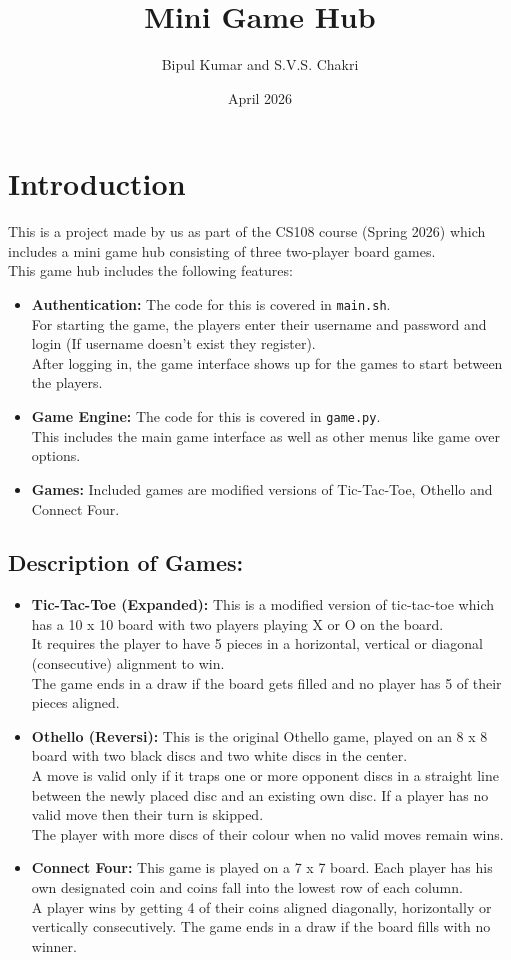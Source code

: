 \documentclass{article}
\title{Mini Game Hub}
\author{Bipul Kumar and S.V.S. Chakri}
\date{April 2026}
\begin{document}
\maketitle
\tableofcontents
\clearpage

\section{Introduction}
This is a project made by us as part of the CS108 course (Spring 2026) which includes a mini game hub consisting of three two-player board games.
\\
This game hub includes the following features:
\begin{itemize}
    \item \textbf{Authentication:} The code for this is covered in \texttt{main.sh}. \\ For starting the game, the players enter their username and password and login (If username doesn't exist they register). \\ After logging in, the game interface shows up for the games to start between the players.
    \item \textbf{Game Engine: } The code for this is covered in \texttt{game.py}. \\ This includes the main game interface as well as other menus like game over options.
    \item \textbf{Games:} Included games are modified versions of Tic-Tac-Toe, Othello and Connect Four.
\end{itemize}
\subsection{Description of Games:}
\begin{itemize}
    \item \textbf{Tic-Tac-Toe (Expanded):} This is a modified version of tic-tac-toe which has a 10 x 10 board with two players playing X or O on the board.
    \\ It requires the player to have 5 pieces in a horizontal, vertical or diagonal (consecutive) alignment to win.
    \\ The game ends in a draw if the board gets filled and no player has 5 of their pieces aligned.
    \item \textbf{Othello (Reversi):} This is the original Othello game, played on an 8 x 8 board with two black discs and two white discs in the center.
    \\ A move is valid only if it traps one or more opponent discs in a straight line between the newly placed disc and an existing own disc. If a player has no valid move then their turn is skipped.
    \\ The player with more discs of their colour when no valid moves remain wins.
    \item \textbf{Connect Four: } This game is played on a 7 x 7 board. Each player has his own designated coin and coins fall into the lowest row of each column. 
    \\ A player wins by getting 4 of their coins aligned diagonally, horizontally or vertically consecutively. The game ends in a draw if the board fills with no winner.
\end{itemize}
\end{document}
